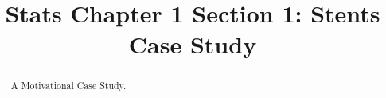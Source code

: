 \documentclass{ximera}
\title{Stats Chapter 1 Section 1: Stents Case Study}
\begin{document}
      
\begin{abstract}
      
A Motivational Case Study.
      
\end{abstract}
      
\maketitle
      
      
      
\end{document}

